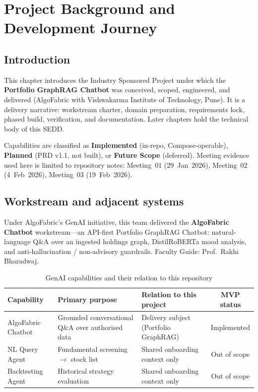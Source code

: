 \chapter{Project Background and Development Journey}
\label{ch:journey}

\section{Introduction}

This chapter introduces the Industry Sponsored Project under which the \textbf{Portfolio GraphRAG Chatbot} was conceived, scoped, engineered, and delivered (AlgoFabric with Vishwakarma Institute of Technology, Pune). It is a delivery narrative: workstream charter, domain preparation, requirements lock, phased build, verification, and documentation. Later chapters hold the technical body of this SEDD.

Capabilities are classified as \textbf{Implemented} (in-repo, Compose-operable), \textbf{Planned} (PRD v1.1, not built), or \textbf{Future Scope} (deferred). Meeting evidence used here is limited to repository notes: Meeting~01 (29~Jan~2026), Meeting~02 (4~Feb~2026), Meeting~03 (19~Feb~2026).

\section{Workstream and adjacent systems}

Under AlgoFabric's GenAI initiative, this team delivered the \textbf{AlgoFabric Chatbot} workstream---an API-first Portfolio GraphRAG Chatbot: natural-language Q\&A over an ingested holdings graph, DistilRoBERTa mood analysis, and anti-hallucination / non-advisory guardrails. Faculty Guide: Prof.\ Rakhi Bharadwaj.

\begin{table}[!htbp]
\centering
\small
\caption{GenAI capabilities and their relation to this repository}
\label{tab:genai-tracks}
\begin{tabularx}{\textwidth}{@{}lXXc@{}}
\toprule
\textbf{Capability} & \textbf{Primary purpose} & \textbf{Relation to this project} & \textbf{MVP status} \\
\midrule
AlgoFabric Chatbot & Grounded conversational Q\&A over authorised data & Delivery subject (Portfolio GraphRAG) & Implemented \\
NL Query Agent & Fundamental screening $\rightarrow$ stock list & Shared onboarding context only & Out of scope \\
Backtesting Agent & Historical strategy evaluation & Shared onboarding context only & Out of scope \\
\bottomrule
\end{tabularx}
\end{table}

